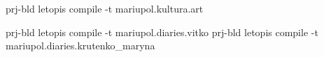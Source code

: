  
 
 
 
 

prj-bld letopis compile -t mariupol.kultura.art

prj-bld letopis compile -t mariupol.diaries.vitko
prj-bld letopis compile -t mariupol.diaries.krutenko_maryna
